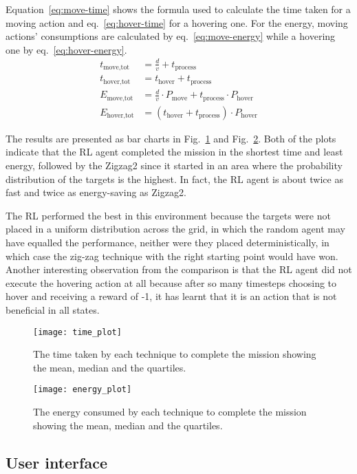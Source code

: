 \documentclass[../main.tex]{subfiles}
\begin{document}
Equation~\ref{eq:move-time} shows the formula used to
calculate the time taken for a moving action and
eq.~\ref{eq:hover-time} for a hovering one.
For the energy, moving actions' consumptions are calculated
by eq.~\ref{eq:move-energy} while a hovering one by
eq.~\ref{eq:hover-energy}.
\begin{align}
t_{\text{move,tot}} &= 
\frac{d}{v} + t_{\text{process}}
	\label{eq:move-time}
        \\
t_{\text{hover,tot}} &= 
t_{\text{hover}} + t_{\text{process}}
	\label{eq:hover-time}
        \\
E_{\text{move,tot}} &= 
\frac{d}{v} \cdot P_{\text{move}} 
+ t_{\text{process}} \cdot P_{\text{hover}}
	\label{eq:move-energy}
        \\
E_{\text{hover,tot}} &= 
\left( t_{\text{hover}} + t_{\text{process}} \right) \cdot P_{\text{hover}}
	\label{eq:hover-energy}
\end{align}

The results are presented as bar charts in 
Fig.~\ref{fig:time-plot} and Fig.~\ref{fig:energy-plot}.
Both of the plots indicate that the RL agent completed
the mission in the shortest time and least energy, followed
by the Zigzag2 since it started in an area 
where the probability
distribution of the targets is the highest.
In fact, the RL agent is about twice as fast and twice
as energy-saving as Zigzag2.

The RL performed the best in this environment because
the targets were not placed in a uniform distribution
across the grid,
in which the random agent may have equalled the performance,
neither were they placed deterministically, 
in which case the zig-zag technique with the
right starting point would have won.
Another interesting observation from the comparison is that
the RL agent did not execute the hovering action at all
because after so many timesteps choosing to hover and
receiving a reward of -1, it has learnt that it is an
action that is not beneficial in all states.

\begin{figure}[!t]
	\centering
	\texttt{[image: time\_plot]}
	\caption{The time taken by each technique
        to complete the mission showing the mean,
    median and the quartiles.}
        \label{fig:time-plot}
\end{figure}

\begin{figure}[!t]
	\centering
	\texttt{[image: energy\_plot]}
	\caption{The energy consumed by each technique
        to complete the mission showing the mean,
    median and the quartiles.}
        \label{fig:energy-plot}
\end{figure}

\subsection{User interface}

\lipsum[1]
\end{document}
